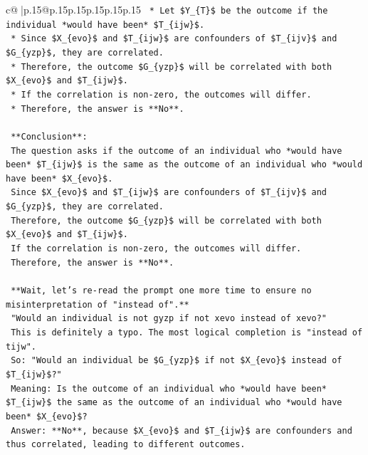 \documentclass{article}
\begin{document}
{\begin{supertabular}{c@{$\;$}|p{.15\linewidth}@{}p{.15\linewidth}p{.15\linewidth}p{.15\linewidth}p{.15\linewidth}p{.15\linewidth}}
{{{\texttt{    *   Let \$Y\_\{T\}\$ be the outcome if the individual *would have been* \$T\_\{ijw\}\$.} \\
\texttt{    *   Since \$X\_\{evo\}\$ and \$T\_\{ijw\}\$ are confounders of \$T\_\{ijv\}\$ and \$G\_\{yzp\}\$, they are correlated.} \\
\texttt{    *   Therefore, the outcome \$G\_\{yzp\}\$ will be correlated with both \$X\_\{evo\}\$ and \$T\_\{ijw\}\$.} \\
\texttt{    *   If the correlation is non{-}zero, the outcomes will differ.} \\
\texttt{    *   Therefore, the answer is **No**.} \\
\\ 
\texttt{    **Conclusion**:} \\
\texttt{    The question asks if the outcome of an individual who *would have been* \$T\_\{ijw\}\$ is the same as the outcome of an individual who *would have been* \$X\_\{evo\}\$.} \\
\texttt{    Since \$X\_\{evo\}\$ and \$T\_\{ijw\}\$ are confounders of \$T\_\{ijv\}\$ and \$G\_\{yzp\}\$, they are correlated.} \\
\texttt{    Therefore, the outcome \$G\_\{yzp\}\$ will be correlated with both \$X\_\{evo\}\$ and \$T\_\{ijw\}\$.} \\
\texttt{    If the correlation is non{-}zero, the outcomes will differ.} \\
\texttt{    Therefore, the answer is **No**.} \\
\\ 
\texttt{    **Wait, let's re{-}read the prompt one more time to ensure no misinterpretation of "instead of".**} \\
\texttt{    "Would an individual is not gyzp if not xevo instead of xevo?"} \\
\texttt{    This is definitely a typo. The most logical completion is "instead of tijw".} \\
\texttt{    So: "Would an individual be \$G\_\{yzp\}\$ if not \$X\_\{evo\}\$ instead of \$T\_\{ijw\}\$?"} \\
\texttt{    Meaning: Is the outcome of an individual who *would have been* \$T\_\{ijw\}\$ the same as the outcome of an individual who *would have been* \$X\_\{evo\}\$?} \\
\texttt{    Answer: **No**, because \$X\_\{evo\}\$ and \$T\_\{ijw\}\$ are confounders and thus correlated, leading to different outcomes.} \\
\\ 
}}}
\end{supertabular}}
\end{document}
